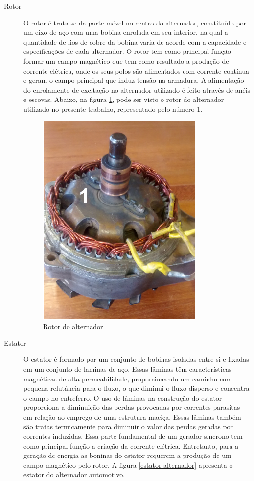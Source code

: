 \begin{description}

\item [Rotor]
O rotor é trata-se da parte móvel no centro do alternador, constituído por um eixo de aço com uma bobina enrolada em seu interior, na qual a quantidade de fios de cobre da bobina varia de acordo com a capacidade e especificações de cada alternador. O rotor tem como principal função formar um campo magnético que tem como resultado a produção de corrente elétrica, onde os seus polos são alimentados com corrente contínua e geram o campo principal que induz tensão na armadura. A alimentação do enrolamento de excitação no alternador utilizado é feito através de anéis e escovas. 
Abaixo, na figura \ref{rotor-alternador}, pode ser visto o rotor do alternador utilizado no presente trabalho, representado pelo número 1.

\begin{figure}[h]
	\centering
	\includegraphics[scale=0.8] {figuras/rotor_alternador.png}
	\caption{Rotor do alternador}
	\label{rotor-alternador}
\end{figure}

\item [Estator]

O estator é formado por um conjunto de bobinas isoladas entre si e fixadas em um conjunto de laminas de aço. Essas lâminas têm características magnéticas de alta permeabilidade, proporcionando um caminho com pequena relutância para o fluxo, o que diminui o fluxo disperso e concentra o campo no entreferro. O uso de lâminas na construção do estator proporciona a diminuição das perdas provocadas por correntes parasitas em relação ao emprego de uma estrutura maciça. Essas lâminas também são tratas termicamente para diminuir o valor das perdas geradas por correntes induzidas.
Essa parte fundamental de um gerador síncrono tem como principal função a criação da corrente elétrica. Entretanto, para a geração de energia as boninas do estator requerem a produção de um campo magnético pelo rotor. A figura \ref{estator-alternador} apresenta o estator do alternador automotivo. 


\end{description}
